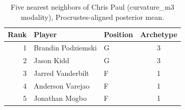 \begin{table}[htbp]
  \centering\small
  \begin{tabular}{rllc}
    \toprule
    Rank & Player & Position & Archetype \\
    \midrule
    1 & Brandin Podziemski & G & 3 \\
    2 & Jason Kidd & G & 3 \\
    3 & Jarred Vanderbilt & F & 1 \\
    4 & Anderson Varejao & F & 1 \\
    5 & Jonathan Mogbo & F & 1 \\
    \bottomrule
  \end{tabular}
  \caption{Five nearest neighbors of Chris Paul (curvature_m3 modality), Procrustes-aligned posterior mean.}
  \label{tab:Chris_Paul_neighbors_curvature_m3}
\end{table}

